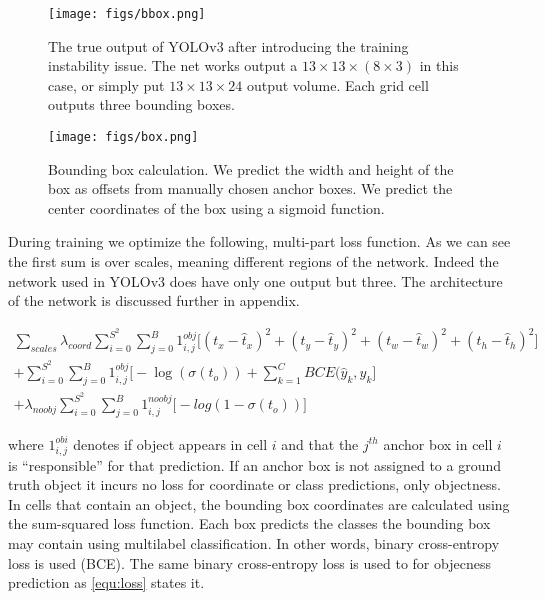 \bigskip
\begin{figure}[!htbp]
  \centering
  \texttt{[image: figs/bbox.png]}
  \caption{The true output of YOLOv3 after introducing the training instability issue. The net works output a $ 13 \times 13 \times (8 \times 3)$ in this case, or simply put $13 \times 13 \times 24$ output volume. Each grid cell outputs three bounding boxes.}\label{fig:true_yolo_output}
\end{figure}

\begin{figure}[H]
  \centering
  \texttt{[image: figs/box.png]}
  \caption{Bounding box calculation. We predict the width and height of the box as offsets from manually chosen anchor boxes. We predict the center
    coordinates of the box using a sigmoid function.}\label{fig:bbox_calculation}
\end{figure}

During training we optimize the following, multi-part loss function. As we can see the first sum is over scales, meaning different regions of the network. Indeed the network used in YOLOv3 does have only one output but three. The architecture of the network is discussed further in appendix.

\begin{multline}
  \label{equ:loss}
  \sum_{scales} \lambda_{coord} \sum_{i=0}^{S^2}  \sum_{j=0}^{B} {1}^{obj}_{i,j}  \big[ (t_x - \hat{t}_x)^2  +  (t_y - \hat{t}_y)^2  +  (t_w - \hat{t}_w)^2  +  (t_h - \hat{t}_h)^2  \big] \\
+ \sum_{i=0}^{S^2}  \sum_{j=0}^{B} {1}^{obj}_{i,j} \big[ - \log(\sigma(t_o))  + \sum_{k=1}^{C} BCE(\hat{y}_k, y_k \big]   \\
+ \lambda_{noobj} \sum_{i=0}^{S^2}  \sum_{j=0}^{B} {1}^{noobj}_{i,j}  \big[ -log(1-\sigma(t_o))  \big]
\end{multline}

where $1^{obi}_{i, j}$ denotes if object appears in cell $i$ and that the $j^{th}$ anchor box in cell $i$ is “responsible” for that prediction.
If an anchor box is not assigned to a ground truth object it incurs no loss for coordinate or class predictions, only objectness.
In cells that contain an object, the bounding box coordinates are calculated using the sum-squared loss function.
Each box predicts the classes the bounding box may contain using multilabel classification. In other words, binary cross-entropy loss is used (BCE).
The same binary cross-entropy loss is used to for objecness prediction as \cref{equ:loss} states it.

